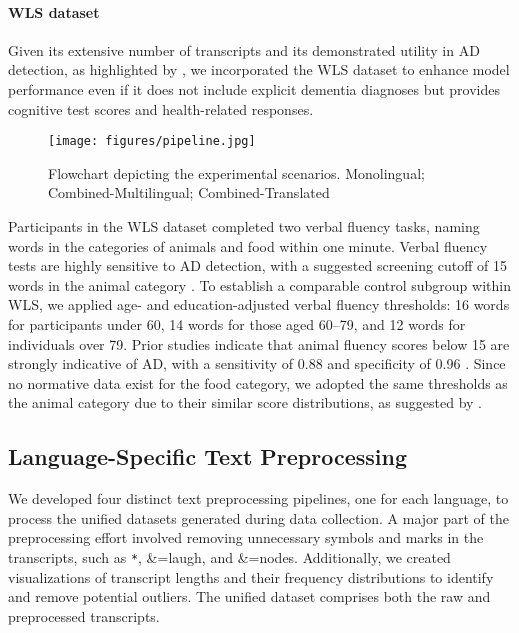 \paragraph{WLS dataset}
Given its extensive number of transcripts and its demonstrated utility in AD detection, as highlighted by \citet{guo2021crossing}, we incorporated the WLS dataset to enhance model performance even if it does not include explicit dementia diagnoses but provides cognitive test scores and health-related responses. 


\begin{figure*}[t]
    \centering
    \texttt{[image: figures/pipeline.jpg]} %
     \caption{Flowchart depicting the experimental scenarios. Monolingual;  Combined-Multilingual; Combined-Translated}
    \label{fig:variants}
\end{figure*}


Participants in the WLS dataset completed two verbal fluency tasks, naming words in the categories of animals and food within one minute. Verbal fluency tests are highly sensitive to AD detection, with a suggested screening cutoff of 15 words in the animal category \cite{guo2021crossing}. To establish a comparable control subgroup within WLS, we applied age- and education-adjusted verbal fluency thresholds: 16 words for participants under 60, 14 words for those aged 60–79, and 12 words for individuals over 79. Prior studies indicate that animal fluency scores below 15 are strongly indicative of AD, with a sensitivity of 0.88 and specificity of 0.96 \cite{guo2021crossing}. Since no normative data exist for the food category, we adopted the same thresholds as the animal category due to their similar score distributions, as suggested by \citet{guo2021crossing}.



\subsection{Language-Specific Text Preprocessing}

We developed four distinct text preprocessing pipelines, one for each language, to process the unified datasets generated during data collection. A major part of the preprocessing effort involved removing unnecessary symbols and marks in the transcripts, such as \texttt{*}, \&=laugh, and \&=nodes. Additionally, we created visualizations of transcript lengths and their frequency distributions to identify and remove potential outliers. The unified dataset comprises both the raw and preprocessed transcripts.




